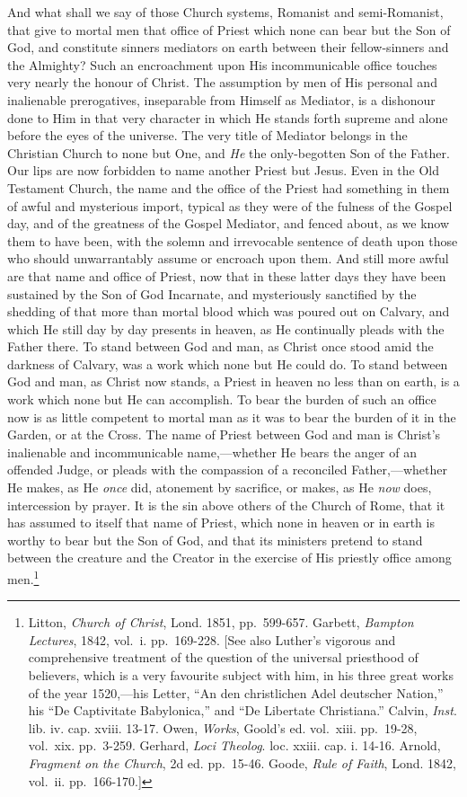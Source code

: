 \documentclass[english,]{book}
\begin{document}
And what shall we say of those Church systems, Romanist and semi-Romanist, that give to mortal men that office of Priest which none can bear but the Son of God, and constitute sinners mediators on earth between their fellow-sinners and the Almighty? Such an encroachment upon His incommunicable office touches very nearly the honour of Christ. The assumption by men of His personal and inalienable prerogatives, inseparable from Himself as Mediator, is a dishonour done to Him in that very character in which He stands forth supreme and alone before the eyes of the universe. The very title of Mediator belongs in the Christian Church to none but One, and \emph{He} the only-begotten Son of the Father. Our lips are now forbidden to name another Priest but Jesus. Even in the Old Testament Church, the name and the office of the Priest had something in them of awful and mysterious import, typical as they were of the fulness of the Gospel day, and of the greatness of the Gospel Mediator, and fenced about, as we know them to have been, with the solemn and irrevocable sentence of death upon those who should unwarrantably assume or encroach upon them. And still more awful are that name and office of Priest, now that in these latter days they have been sustained by the Son of God Incarnate, and mysteriously sanctified by the shedding of that more than mortal blood which was poured out on Calvary, and which He still day by day presents in heaven, as He continually pleads with the Father there. To stand between God and man, as Christ once stood amid the darkness of Calvary, was a work which none but He could do. To stand between God and man, as Christ now stands, a Priest in heaven no less than on earth, is a work which none but He can accomplish. To bear the burden of such an office now is as little competent to mortal man as it was to bear the burden of it in the Garden, or at the Cross. The name of Priest between God and man is Christ's inalienable and incommunicable name,---whether He bears the anger of an offended Judge, or pleads with the compassion of a reconciled Father,---whether He makes, as He \emph{once} did, atonement by sacrifice, or makes, as He \emph{now} does, intercession by prayer. It is the sin above others of the Church of Rome, that it has assumed to itself that name of Priest, which none in heaven or in earth is worthy to bear but the Son of God, and that its ministers pretend to stand between the creature and the Creator in the exercise of His priestly office among men.\footnote{Litton, \emph{Church of Christ}, Lond. 1851, pp.~599-657. Garbett, \emph{Bampton Lectures}, 1842, vol.~i. pp.~169-228. {[}See also Luther's vigorous and comprehensive treatment of the question of the universal priesthood of believers, which is a very favourite subject with him, in his three great works of the year 1520,---his Letter, ``An den christlichen Adel deutscher Nation,'' his ``De Captivitate Babylonica,'' and ``De Libertate Christiana.'' Calvin, \emph{Inst}. lib. iv. cap. xviii. 13-17. Owen, \emph{Works}, Goold's ed. vol.~xiii. pp.~19-28, vol.~xix. pp.~3-259. Gerhard, \emph{Loci Theolog}. loc. xxiii. cap. i. 14-16. Arnold, \emph{Fragment on the Church}, 2d ed. pp.~15-46. Goode, \emph{Rule of Faith}, Lond. 1842, vol.~ii. pp.~166-170.{]}}
\end{document}
